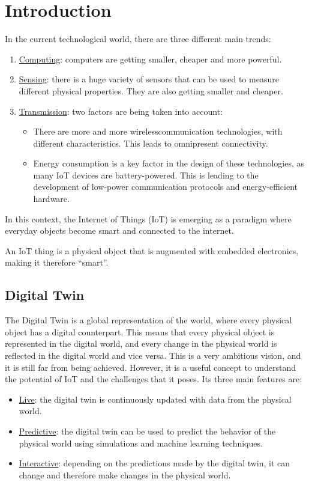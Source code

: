 \chapter{Introduction}

In the current technological world, there are three different main trends:
\begin{enumerate}
    \item \ul{Computing}: computers are getting smaller, cheaper and more powerful.
    \item \ul{Sensing}: there is a huge variety of sensors that can be used to measure different physical properties. They are also getting smaller and cheaper.
    \item \ul{Transmission}: two factors are being taken into account:
    \begin{itemize}
        \item There are more and more wirelesscommunication technologies, with different characteristics. This leads to omnipresent connectivity.
        \item Energy consumption is a key factor in the design of these technologies, as many IoT devices are battery-powered. This is leading to the development of low-power communication protocols and energy-efficient hardware.
    \end{itemize}
\end{enumerate}

In this context, the Internet of Things (IoT) is emerging as a paradigm where everyday objects become smart and connected to the internet.
\begin{definicion}
    An IoT thing is a physical object that is augmented with embedded electronics, making it therefore ``smart''.
\end{definicion}

\section{Digital Twin}

The Digital Twin is a global representation of the world, where every physical object has a digital counterpart. This means that every physical object is represented in the digital world, and every change in the physical world is reflected in the digital world and vice versa. This is a very ambitious vision, and it is still far from being achieved. However, it is a useful concept to understand the potential of IoT and the challenges that it poses. Its three main features are:
\begin{itemize}
    \item \ul{Live}: the digital twin is continuously updated with data from the physical world.
    \item \ul{Predictive}: the digital twin can be used to predict the behavior of the physical world using simulations and machine learning techniques.
    \item \ul{Interactive}: depending on the predictions made by the digital twin, it can change and therefore make changes in the physical world.
\end{itemize}

